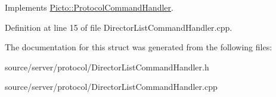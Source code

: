 Implements \hyperlink{struct_picto_1_1_protocol_command_handler_aeeaa16fe40f10fd55996d74e16e29cad}{Picto\-::\-Protocol\-Command\-Handler}.



Definition at line 15 of file Director\-List\-Command\-Handler.\-cpp.



The documentation for this struct was generated from the following files\-:\begin{DoxyCompactItemize}
\item 
source/server/protocol/Director\-List\-Command\-Handler.\-h\item 
source/server/protocol/Director\-List\-Command\-Handler.\-cpp\end{DoxyCompactItemize}
